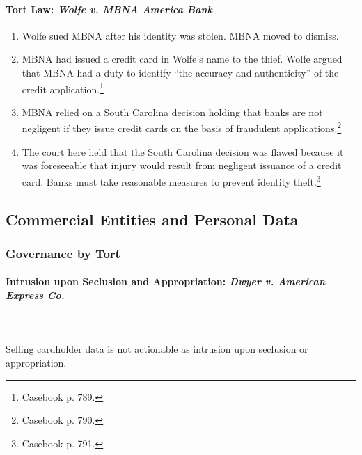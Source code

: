 \paragraph{Tort Law: \emph{Wolfe v. MBNA America Bank}}

\begin{enumerate}
    \item Wolfe sued MBNA after his identity was stolen. MBNA moved to dismiss.
    \item MBNA had issued a credit card in Wolfe's name to the thief. Wolfe 
    argued that MBNA had a duty to identify ``the accuracy and authenticity'' of 
    the credit application.\footnote{Casebook p. 789.}
    \item MBNA relied on a South Carolina decision holding that banks are not 
    negligent if they issue credit cards on the basis of fraudulent 
    applications.\footnote{Casebook p. 790.}
    \item The court here held that the South Carolina decision was flawed 
    because it was foreseeable that injury would result from negligent issuance 
    of a credit card. Banks must take reasonable measures to prevent identity 
    theft.\footnote{Casebook p. 791.}
\end{enumerate}

\subsection{Commercial Entities and Personal Data}

\subsubsection{Governance by Tort}

\paragraph{Intrusion upon Seclusion and Appropriation: \emph{Dwyer v. American 
Express Co.}}
~\\\\
Selling cardholder data is not actionable as intrusion upon seclusion or 
appropriation.

